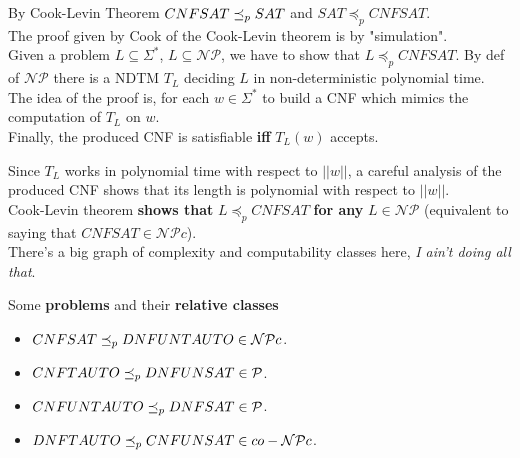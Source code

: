 \documentclass[11pt]{article}
\begin{document}
	
	By Cook-Levin Theorem $CNFSAT \preceq_p SAT$ and $SAT \preceq_p CNFSAT$.\\
	
	The proof given by Cook of the Cook-Levin theorem is by "simulation".\\
	
	Given a problem $L \subseteq \Sigma^\ast$, $L \subseteq \mathcal{NP}$, we have to show that $L \preceq_p CNFSAT$. By def of $\mathcal{NP}$ there is a NDTM $T_L$ deciding $L$ in non-deterministic polynomial time.\\
	
	The idea of the proof is, for each $w \in \Sigma^\ast$ to build a CNF which mimics the computation of $T_L$ on $w$.\\
	Finally, the produced CNF is satisfiable \textbf{iff} $T_L (w)$ accepts.\\
	
	\newpage
	
	Since $T_L$ works in polynomial time with respect to $||w||$, a careful analysis of the produced CNF shows that its length is polynomial with respect to $||w||$.\\
	
	Cook-Levin theorem \textbf{shows that} $L \preceq_p CNFSAT$ \textbf{for any} $L \in \mathcal{NP}$ (equivalent to saying that $CNFSAT \in \mathcal{NP}c$).\\
	
	There's a big graph of complexity and computability classes here, \textit{I ain't doing all that}.\\
	
	\nn 
	
	Some \textbf{problems} and their \textbf{relative classes}
	\begin{itemize}
		\item $CNFSAT \preceq_p DNFUNTAUTO \in \mathcal{NP} c$.\\
		
		\item $CNFTAUTO \preceq_p DNFUNSAT \in \mathcal{P}$.\\
		
		\item $CNFUNTAUTO \preceq_p DNFSAT \in \mathcal{P}$.\\
		
		\item $DNFTAUTO \preceq_p CNFUNSAT \in co-\mathcal{NP} c$.\\
		
	\end{itemize}
	
\end{document}
